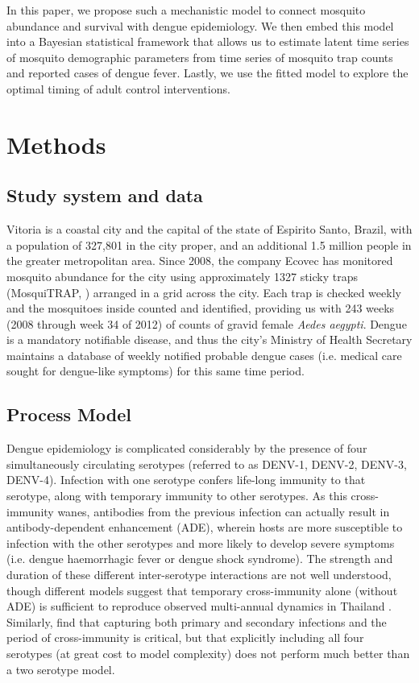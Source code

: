 \documentclass[10pt,letterpaper]{article}
\begin{document}
In this paper, we propose such a mechanistic model to connect mosquito abundance and survival with dengue epidemiology.
We then embed this model into a Bayesian statistical framework that allows us to estimate latent time series of mosquito demographic parameters from time series of mosquito trap counts and reported cases of dengue fever.
Lastly, we use the fitted model to explore the optimal timing of adult control interventions.

\section*{Methods}

\subsection*{Study system and data}

Vitoria is a coastal city and the capital of the state of Espirito Santo, Brazil, with a population of 327,801 in the city proper, and an additional 1.5 million people in the greater metropolitan area.  
Since 2008, the company Ecovec has monitored mosquito abundance for the city using approximately 1327 sticky traps (MosquiTRAP, \cite{Eiras2009}) arranged in a grid across the city.
Each trap is checked weekly and the mosquitoes inside counted and identified, providing us with 243 weeks (2008 through week 34 of 2012) of counts of gravid female \emph{Aedes aegypti}.
Dengue is a mandatory notifiable disease, and thus the city's Ministry of Health Secretary maintains a database of weekly notified probable dengue cases (i.e. medical care sought for dengue-like symptoms) for this same time period.

\subsection*{Process Model}

Dengue epidemiology is complicated considerably by the presence of four simultaneously circulating serotypes (referred to as DENV-1, DENV-2, DENV-3, DENV-4).
Infection with one serotype confers life-long immunity to that serotype, along with temporary immunity to other serotypes.  
As this cross-immunity wanes, antibodies from the previous infection can actually result in antibody-dependent enhancement (ADE), wherein hosts are more susceptible to infection with the other serotypes and more likely to develop severe symptoms (i.e. dengue haemorrhagic fever or dengue shock syndrome).
The strength and duration of these different inter-serotype interactions are not well understood, though different models suggest that temporary cross-immunity alone (without ADE) is sufficient to reproduce observed multi-annual dynamics in Thailand \cite{Wearing2006,Reich2013}.
Similarly, \cite{Aguiar2013} find that capturing both primary and secondary infections and the period of cross-immunity is critical, but that explicitly including all four serotypes (at great cost to model complexity) does not perform much better than a two serotype model.
\end{document}
